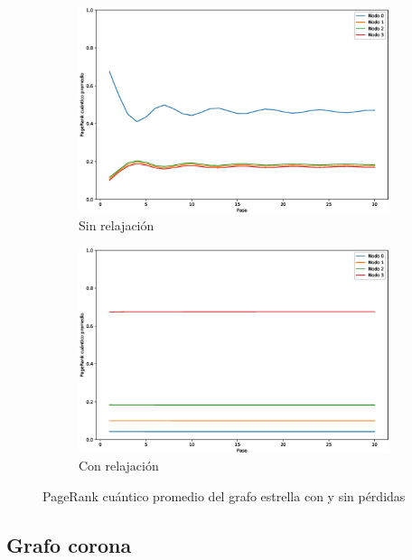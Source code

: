 \begin{figure}[H]
    \centering
    \begin{subfigure}[m]{0.9\textwidth}
        \centering
        \includegraphics[width=0.9\linewidth]{img/star-mean-lossless.eps}
        \caption{Sin relajación}
    \end{subfigure}
    \begin{subfigure}[m]{0.9\textwidth}
        \centering
        \includegraphics[width=0.9\linewidth]{img/star-mean-lossy.eps}
        \caption{Con relajación}
    \end{subfigure}
    \caption[PageRank cuántico promedio del grafo estrella con y sin pérdidas]{PageRank cuántico promedio del grafo estrella con y sin pérdidas}
    \label{fig:meanstarlossy}
\end{figure}

\subsection{Grafo corona}

